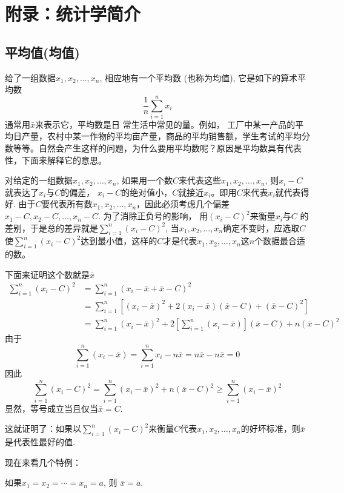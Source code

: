 \chapter{附录：统计学简介}

\section*{平均值(均值)}

给了一组数据$x_1,x_2,\ldots,x_n$, 相应地有一个平均数
(也称为均值), 它是如下的算术平均数
\[\frac{1}{n} \sum_{i=1}^nx_i\]
通常用$\bar x$来表示它，平均数是日 常生活中常见的量。例如， 工厂中某一产品的平均日产量，农村中某一作物的平均亩产量，商品的平均销售额，学生考试的平均分数等等。自然会产生这样的问题，为什么要用平均数呢？原因是平均数具有代表性，下面来解释它的意思。

对给定的一组数据$x_1,x_2,\ldots,x_n$, 如果用一个数$C$来代表这些$x_1,x_2,\ldots,x_n$, 则$x_i-C$就表达了$x_i$与$C$的偏差， $x_i-C$的绝对值小，$C$就接近$x_i$。即用$C$来代表$x_i$就代表得好. 由于$C$要代表所有数$x_1,x_2,\ldots,x_n$，因此必须考虑几个偏差$x_{1}-C,x_{2}-C,\ldots,x_{n}-C$. 为了消除正负号的影响， 用$(x_i-C)^2$来衡量$x_i$与$C$ 的差别，于是总的差异就是$\sum\limits_{i= 1}^{n}\left ( x_{i}- C\right ) ^{2}$, 当$x_{1},x_{2},\ldots,x_{n}$确定不变时，应选取$C$使$\sum\limits_{i= 1}^{n}\left ( x_{i}- C\right ) ^{2}$达到最小值，这样的$C$才是代表$x_{1},x_{2},\ldots,x_{n}$这$n$个数据最合适的数。

下面来证明这个数就是$\bar x$
\[\begin{split}
    \sum_{i=1}^{n} ( x_{i}-C)^{2} &=\sum_{i=1}^{n} ( x_{i}-\bar{x}+\bar{x}-{C} )^{2} \\
    &=\sum_{i=1}^{n}\left[\left( x_{i}-\bar{x}\right) ^{2}+2\left( x_{i}-\bar{x}\right) ( \bar{x}-C)+(\bar{x}-C)^{2}\right]\\
    &=\sum_{i=1}^{n}\left( x_{i}-\bar{x}\right)^{2}+2\left[\sum_{i=1}^{n}\left( x_{i}-\bar{x}\right)\right](\bar{x}-C)+n(\bar{x}-C)^{2}
\end{split}\]
由于
$$\sum_{i=1}^{n} ( x_{i}-\bar{x} ) =\sum_{i=1}^{n} x_{i}-n\bar{x}=n\bar{x}-n\bar{x}=0$$
因此
$$\sum_{i=1}^{n}(x_{i}-C)^{2}=\sum_{i=1}^{n}(x_{i}-\bar{x})^{2}+n(\bar{x}-C)^{2}\ge \sum_{i=1}^{n}(x_{i}-\bar{x})^{2}$$
显然，等号成立当且仅当$\bar x=C$.

这就证明了：如果以$\sum\limits_{i=1}^n(x_i-C)^2$来衡量$C$代表$x_1,
x_{2},\ldots,x_{n}$的好坏标准，则$\bar x$是代表性最好的值.

现在来看几个特例：

\begin{example}
    如果$x_1=x_2=\cdots=x_n=a$, 则 $\bar{x}=a$.
\end{example}


